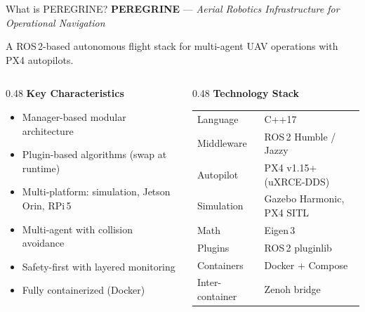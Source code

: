 \documentclass[aspectratio=169, 10pt]{beamer}
\begin{document}
\begin{frame}{What is PEREGRINE?}
\textbf{PEREGRINE} --- \emph{Aerial Robotics Infrastructure for Operational Navigation}

A ROS\,2-based autonomous flight stack for \alert{multi-agent UAV operations} with PX4 autopilots.

\vspace{0.8em}
\begin{columns}[T]
\begin{column}{0.48\textwidth}
\textbf{Key Characteristics}
\begin{itemize}
  \item Manager-based modular architecture
  \item Plugin-based algorithms (swap at runtime)
  \item Multi-platform: simulation, Jetson Orin, RPi\,5
  \item Multi-agent with collision avoidance
  \item Safety-first with layered monitoring
  \item Fully containerized (Docker)
\end{itemize}
\end{column}
\begin{column}{0.48\textwidth}
\textbf{Technology Stack}
\begin{tabular}{@{}ll@{}}
\toprule
\scriptsize Language & \scriptsize C++17 \\
\scriptsize Middleware & \scriptsize ROS\,2 Humble / Jazzy \\
\scriptsize Autopilot & \scriptsize PX4 v1.15+ (uXRCE-DDS) \\
\scriptsize Simulation & \scriptsize Gazebo Harmonic, PX4 SITL \\
\scriptsize Math & \scriptsize Eigen\,3 \\
\scriptsize Plugins & \scriptsize ROS\,2 pluginlib \\
\scriptsize Containers & \scriptsize Docker + Compose \\
\scriptsize Inter-container & \scriptsize Zenoh bridge \\
\bottomrule
\end{tabular}
\end{column}
\end{columns}
\end{frame}
\end{document}
